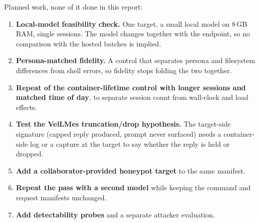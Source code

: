 \documentclass[a4paper,11pt]{article}
\begin{document}
Planned work, none of it done in this report:
\begin{enumerate}[leftmargin=*]
\item \textbf{Local-model feasibility check.} One target, a small local model on
  8\,GB RAM, single sessions. The model changes together with the endpoint, so
  no comparison with the hosted batches is implied.
\item \textbf{Persona-matched fidelity.} A control that separates persona and
  filesystem differences from shell errors, so fidelity stops folding the two
  together.
\item \textbf{Repeat of the container-lifetime control with longer sessions and
  matched time of day}, to separate session count from wall-clock and load
  effects.
\item \textbf{Test the VelLMes truncation/drop hypothesis.} The target-side
  signature (capped reply produced, prompt never surfaced) needs a
  container-side log or a capture at the target to say whether the reply is
  held or dropped.
\item \textbf{Add a collaborator-provided honeypot target} to the same manifest.
\item \textbf{Repeat the pass with a second model} while keeping the command and
  request manifests unchanged.
\item \textbf{Add detectability probes} and a separate attacker evaluation.
\end{enumerate}
\end{document}
